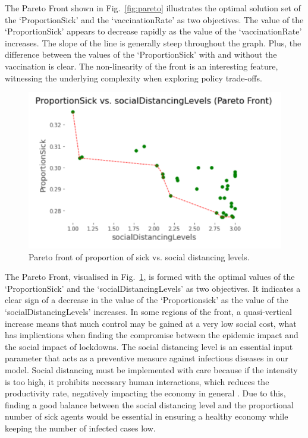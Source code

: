 \documentclass[smallextended]{svjour3}       %
\begin{document}
The Pareto Front shown in Fig.~\ref{fig:pareto} illustrates the optimal solution set of the ‘ProportionSick’ and the ‘vaccinationRate’ as two objectives. The value of the ‘ProportionSick’ appears to decrease rapidly as the value of the ‘vaccinationRate’ increases. The slope of the line is generally steep throughout the graph. Plus, the difference between the values of the ‘ProportionSick’ with and without the vaccination is clear. The non-linearity of the front is an interesting feature, witnessing the underlying complexity when exploring policy trade-offs.


\begin{figure}
	\centering
	\includegraphics[width=0.6\linewidth]{figures/pareto2.png}
	\caption{Pareto front of proportion of sick vs. social distancing levels.\label{fig:pareto2}}	
\end{figure}



The Pareto Front, visualised in Fig.~\ref{fig:pareto2}, is formed with the optimal values of the ‘ProportionSick’ and the ‘socialDistancingLevels’ as two objectives. It indicates a clear sign of a decrease in the value of the ‘Proportionsick’ as the value of the ‘socialDistancingLevels’ increases. In some regions of the front, a quasi-vertical increase means that much control may be gained at a very low social cost, what has implications when finding the compromise between the epidemic impact and the social impact of lockdowns. The social distancing level is an essential input parameter that acts as a preventive measure against infectious diseases in our model. Social distancing must be implemented with care because if the intensity is too high, it prohibits necessary human interactions, which reduces the productivity rate, negatively impacting the economy in general \cite{deluca2020unequal}. Due to this, finding a good balance between the social distancing level and the proportional number of sick agents would be essential in ensuring a healthy economy while keeping the number of infected cases low.
\end{document}

